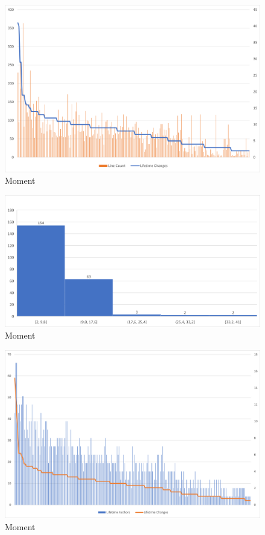 \begin{figure}[H]
    \centering
    \includegraphics[width=1\textwidth]{images/moment/moment-2.20.5-auth.png}
    \caption{Moment}
    \label{fig:moment-2.20.5-auth}
\end{figure}

\begin{figure}[H]
    \centering
    \includegraphics[width=1\textwidth]{images/moment/moment-2.20.5-hist.png}
    \caption{Moment}
    \label{fig:moment-2.20.5-hist}
\end{figure}


\begin{figure}[H]
    \centering
    \includegraphics[width=1\textwidth]{images/moment/moment-dev-changes.png}
    \caption{Moment}
    \label{fig:moment-2.10.5-changes}
\end{figure}

